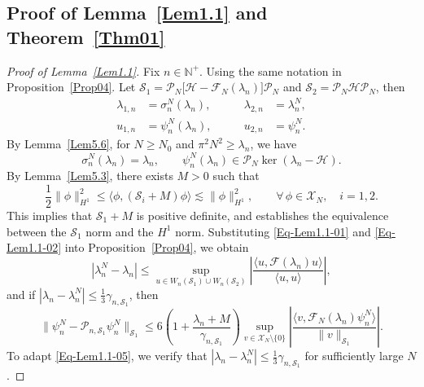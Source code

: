 \documentclass{sn-jnl}%
\numberwithin{equation}{section}
\theoremstyle{thmstyleone}%
\theoremstyle{thmstyletwo}%
\theoremstyle{thmstylethree}%
\begin{document}
\subsection{Proof of \texorpdfstring{Lemma~\ref{Lem1.1}}{lemma1.1} and \texorpdfstring{Theorem~\ref{Thm01}}{theorem1.2}}

\begin{proof}[Proof of Lemma~\ref{Lem1.1}]

Fix $n \in \mathbb{N}^+$. Using the same notation in Proposition~\ref{Prop04}. Let $\mathcal{S}_1 = \mathcal{P}_N \bigl[\mathcal{H} - \mathcal{F}_N(\lambda_n)\bigr] \mathcal{P}_N$ and $\mathcal{S}_2 = \mathcal{P}_N \mathcal{H} \mathcal{P}_N$, then
\begin{equation} \label{Eq-Lem1.1-01}
    \begin{aligned}
    \lambda_{1,n} &= \sigma_n^N(\lambda_n), \qquad &\lambda_{2,n} &= \lambda_n^N, \\
    u_{1,n} &= \psi_n^N(\lambda_n), \qquad &u_{2,n} &= \psi_n^N.
    \end{aligned}
\end{equation}
By Lemma~\ref{Lem5.6}, for $N \geq N_0$ and $\pi^2 N^2 \geq \lambda_n$, we have
\begin{equation}\label{Eq-Lem1.1-02}
    \sigma_n^N(\lambda_n) = \lambda_n, \qquad \psi_n^N(\lambda_n) \in \mathcal{P}_N \operatorname{ker}(\lambda_n - \mathcal{H}).
\end{equation}
By Lemma~\ref{Lem5.3}, there exists $M > 0$ such that 
\begin{equation}\label{Eq-Lem1.1-03}
    \frac{1}{2} \|\phi\|_{H^1}^2 \leq \langle \phi, (\mathcal{S}_i + M) \phi \rangle \lesssim \|\phi\|_{H^1}^2, \qquad \forall\, \phi \in \mathscr{X}_N, \quad i = 1, 2.
\end{equation}
This implies that $\mathcal{S}_1 + M $ is positive definite, and establishes the equivalence between the $\mathcal{S}_1$ norm and the $H^1$ norm. Substituting \eqref{Eq-Lem1.1-01} and \eqref{Eq-Lem1.1-02} into Proposition~\ref{Prop04}, we obtain
\begin{equation}\label{Eq-Lem1.1-04}
    |\lambda_n^N - \lambda_n| \leq 
    \sup_{u \in W_n(\mathcal{S}_1) \cup W_n(\mathcal{S}_2)}
    \left|
    \frac{\langle u, \mathcal{F}(\lambda_n) u \rangle}{\langle u, u \rangle}
    \right|,
\end{equation}
and if $ |\lambda_n - \lambda_n^N| \leq \frac{1}{3} \gamma_{n, \mathcal{S}_1} $, then
\begin{equation}\label{Eq-Lem1.1-05}
    \|\psi_n^N - \mathcal{P}_{n,\mathcal{S}_1}\psi_n^N\|_{\mathcal{S}_1}
    \leq 6\left(1 + \frac{\lambda_n + M}{\gamma_{n, \mathcal{S}_1}}\right)
    \sup_{v \in \mathscr{X}_N \setminus \{0\}}
    \left|
    \frac{\langle v, \mathcal{F}_N(\lambda_n) \psi_n^N \rangle}{\|v\|_{\mathcal{S}_1}}
    \right|.
\end{equation}
To adapt \eqref{Eq-Lem1.1-05}, we verify that $|\lambda_n-\lambda_n^N|\leq \tfrac{1}{3}\gamma_{n,\mathcal{S}_1}$ for sufficiently large $N$. 


\end{proof}
\end{document}
